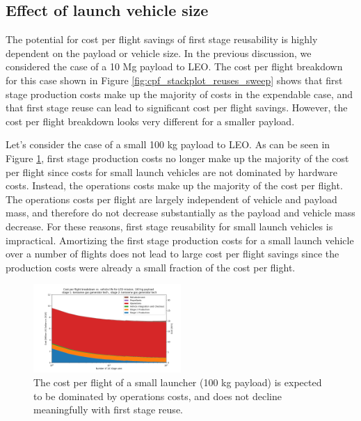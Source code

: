 \documentclass[conf]{new-aiaa}
\begin{document}
\begin{multicols}{2}
\subsection{Effect of launch vehicle size}

The potential for cost per flight savings of first stage reusability is highly dependent on the payload or vehicle size. In the previous discussion, we considered the case of a 10 Mg payload to LEO. The cost per flight breakdown for this case shown in Figure \ref{fig:cpf_stackplot_reuses_sweep} shows that first stage production costs make up the majority of costs in the expendable case, and that first stage reuse can lead to significant cost per flight savings. However, the cost per flight breakdown looks very different for a smaller payload. 

Let's consider the case of a small 100 kg payload to LEO. As can be seen in Figure \ref{fig:cpf_stackplot_reuses_sweep_small_sat}, first stage production costs no longer make up the majority of the cost per flight since costs for small launch vehicles are not dominated by hardware costs. Instead, the operations costs make up the majority of the cost per flight. The operations costs per flight are largely independent of vehicle and payload mass, and therefore do not decrease substantially as the payload and vehicle mass decrease. For these reasons, first stage reusability for small launch vehicles is impractical. Amortizing the first stage production costs for a small launch vehicle over a number of flights does not lead to large cost per flight savings since the production costs were already a small fraction of the cost per flight.

\begin{figure}[H]
    \centering
    \includegraphics[width=0.5\textwidth]{../../lvreuse/analysis/combined/plots/cpf_stackplot_reuses_sweep_small_sat}
    \caption{\label{fig:cpf_stackplot_reuses_sweep_small_sat} The cost per flight of a small launcher (100 kg payload) is expected to be dominated by operations costs, and does not decline meaningfully with first stage reuse.}
\end{figure}


\end{multicols}
\end{document}
